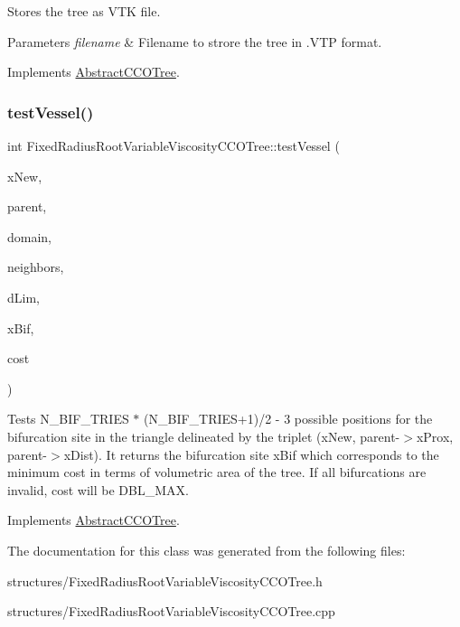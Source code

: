 Stores the tree as V\+TK file. 
\begin{DoxyParams}{Parameters}
{\em filename} & Filename to strore the tree in .V\+TP format. \\
\hline
\end{DoxyParams}


Implements \mbox{\hyperlink{class_abstract_c_c_o_tree}{Abstract\+C\+C\+O\+Tree}}.

\mbox{\label{class_fixed_radius_root_variable_viscosity_c_c_o_tree_ac2216604fbfd0a9e532cb01153a36af6}} 
\subsubsection{\texorpdfstring{test\+Vessel()}{testVessel()}}
{\footnotesize\ttfamily int Fixed\+Radius\+Root\+Variable\+Viscosity\+C\+C\+O\+Tree\+::test\+Vessel (\begin{DoxyParamCaption}\item[{\mbox{\hyperlink{structpoint}{point}}}]{x\+New,  }\item[{\mbox{\hyperlink{structvessel}{vessel}} $\ast$}]{parent,  }\item[{\mbox{\hyperlink{class_abstract_domain}{Abstract\+Domain}} $\ast$}]{domain,  }\item[{vector$<$ \mbox{\hyperlink{structvessel}{vessel}} $\ast$$>$}]{neighbors,  }\item[{double}]{d\+Lim,  }\item[{\mbox{\hyperlink{structpoint}{point}} $\ast$}]{x\+Bif,  }\item[{double $\ast$}]{cost }\end{DoxyParamCaption})\hspace{0.3cm}{\ttfamily [virtual]}}

Tests N\+\_\+\+B\+I\+F\+\_\+\+T\+R\+I\+ES $\ast$ (N\+\_\+\+B\+I\+F\+\_\+\+T\+R\+I\+E\+S+1)/2 -\/ 3 possible positions for the bifurcation site in the triangle delineated by the triplet (x\+New, parent-\/$>$x\+Prox, parent-\/$>$x\+Dist). It returns the bifurcation site x\+Bif which corresponds to the minimum cost in terms of volumetric area of the tree. If all bifurcations are invalid, cost will be D\+B\+L\+\_\+\+M\+AX. 

Implements \mbox{\hyperlink{class_abstract_c_c_o_tree}{Abstract\+C\+C\+O\+Tree}}.



The documentation for this class was generated from the following files\+:\begin{DoxyCompactItemize}
\item 
structures/Fixed\+Radius\+Root\+Variable\+Viscosity\+C\+C\+O\+Tree.\+h\item 
structures/Fixed\+Radius\+Root\+Variable\+Viscosity\+C\+C\+O\+Tree.\+cpp\end{DoxyCompactItemize}
